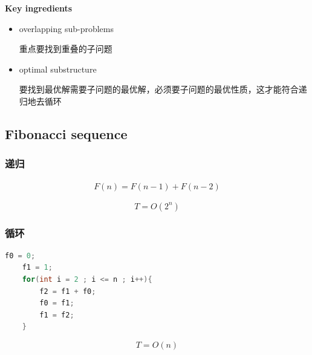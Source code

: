 \documentclass{article}
\begin{document}
\textbf{Key ingredients}
\begin{itemize}
    \item overlapping sub-problems \par
    重点要找到重叠的子问题
    \item optimal substructure \par
    要找到最优解需要子问题的最优解，必须要子问题的最优性质，这才能符合递归地去循环
\end{itemize}

\subsection{Fibonacci sequence}
\subsubsection{递归}
\begin{align*}
    F(n)=F(n-1)+F(n-2)
\end{align*}\par
$$T = O(2^n)$$

\subsubsection{循环}
\begin{lstlisting}[language = C]
    f0 = 0;
    f1 = 1;
    for(int i = 2 ; i <= n ; i++){
        f2 = f1 + f0;
        f0 = f1;
        f1 = f2;
    }
\end{lstlisting}\par
$$T = O(n)$$
\end{document}
